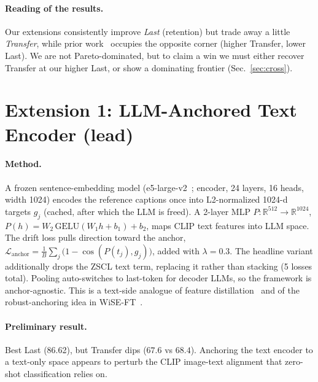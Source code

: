 \documentclass[11pt]{article}
\begin{document}
\paragraph{Reading of the results.} Our extensions consistently improve \emph{Last} (retention) but
trade away a little \emph{Transfer}, while prior work~\cite{gift,loraloop} occupies the opposite
corner (higher Transfer, lower Last). We are not Pareto-dominated, but to claim a win we must either
recover Transfer at our higher Last, or show a dominating frontier (Sec.~\ref{sec:cross}).

\section{Extension 1: LLM-Anchored Text Encoder (lead)}

\paragraph{Method.} A frozen sentence-embedding model (e5-large-v2~\cite{e5}; encoder, 24 layers,
16 heads, width 1024) encodes the reference captions once into L2-normalized 1024-d targets $g_j$
(cached, after which the LLM is freed). A 2-layer MLP $P:\mathbb{R}^{512}\to\mathbb{R}^{1024}$,
$P(h)=W_2\,\mathrm{GELU}(W_1 h + b_1)+b_2$, maps CLIP text features into LLM space. The drift loss
pulls direction toward the anchor,
$\mathcal{L}_{\text{anchor}} = \frac{1}{B}\sum_j \big(1-\cos(P(t_j),g_j)\big)$, added with
$\lambda=0.3$. The headline variant additionally drops the ZSCL text term, replacing it rather than
stacking (5 losses total). Pooling auto-switches to last-token for decoder LLMs, so the framework is
anchor-agnostic. This is a text-side analogue of feature distillation~\cite{fitnets} and of the
robust-anchoring idea in WiSE-FT~\cite{wiseft}.

\paragraph{Preliminary result.} Best Last (86.62), but Transfer dips ($67.6$ vs $68.4$). Anchoring
the text encoder to a text-only space appears to perturb the CLIP image-text alignment that
zero-shot classification relies on.
\end{document}

